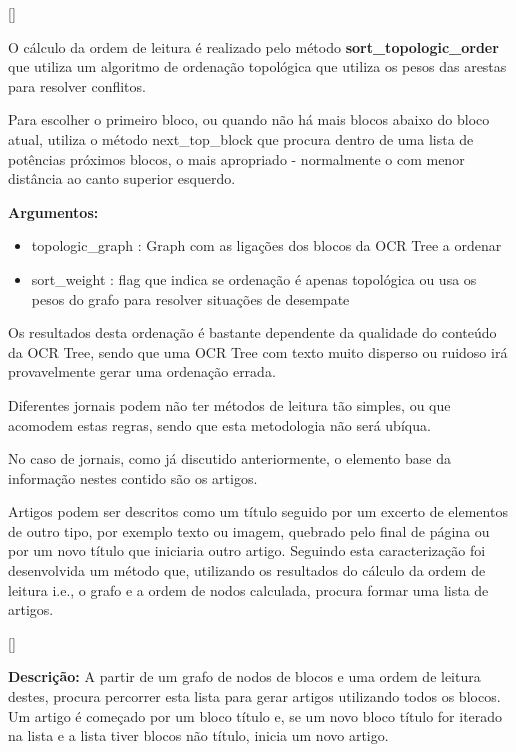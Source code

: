 [\normalsize]

O cálculo da ordem de leitura é realizado pelo método \textbf{sort\_topologic\_order} que utiliza um algoritmo de ordenação topológica que utiliza os pesos das arestas para resolver conflitos.

Para escolher o primeiro bloco, ou quando não há mais blocos abaixo do bloco atual, utiliza o método next\_top\_block que procura dentro de uma lista de potências próximos blocos, o mais apropriado - normalmente o com menor distância ao canto superior esquerdo. 

\textbf{Argumentos:}
\begin{itemize}\setlength\itemsep{-0.3em}
	\item topologic\_graph : Graph com as ligações dos blocos da OCR Tree a ordenar
	\item sort\_weight : flag que indica se ordenação é apenas topológica ou usa os pesos do grafo para resolver situações de desempate
\end{itemize}




Os resultados desta ordenação é bastante dependente da qualidade do conteúdo da OCR Tree, sendo que uma OCR Tree com texto muito disperso ou ruidoso irá provavelmente gerar uma ordenação errada. 

Diferentes jornais podem não ter métodos de leitura tão simples, ou que acomodem estas regras, sendo que esta metodologia não será ubíqua. 



\label{contribution_result_segmentation}

No caso de jornais, como já discutido anteriormente, o elemento base da informação nestes contido são os artigos. 

Artigos podem ser descritos como um título seguido por um excerto de elementos de outro tipo, por exemplo texto ou imagem, quebrado pelo final de página ou por um novo título que iniciaria outro artigo. Seguindo esta caracterização foi desenvolvida um método que, utilizando os resultados do cálculo da ordem de leitura i.e., o grafo e a ordem de nodos calculada, procura formar uma lista de artigos.

[\normalsize]

\textbf{Descrição:} A partir de um grafo de nodos de blocos e uma ordem de leitura destes, procura percorrer esta lista para gerar artigos utilizando todos os blocos. Um artigo é começado por um bloco título e, se um novo bloco título for iterado na lista e a lista tiver blocos não título, inicia um novo artigo.


